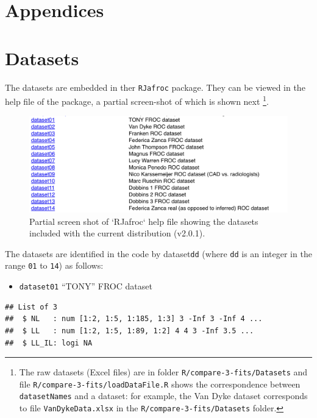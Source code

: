 \documentclass[
]{book}
\providecommand{\tightlist}{%
  \setlength{\itemsep}{0pt}\setlength{\parskip}{0pt}}
\begin{document}
\hypertarget{rsm-3-fits-appendices}{%
\section{Appendices}\label{rsm-3-fits-appendices}}

\hypertarget{rsm-3-fits-14-datasets}{%
\section{Datasets}\label{rsm-3-fits-14-datasets}}

The datasets are embedded in ther \texttt{RJafroc} package. They can be viewed in the help file of the package, a partial screen-shot of which is shown next \footnote{The raw datasets (Excel files) are in folder \texttt{R/compare-3-fits/Datasets} and file \texttt{R/compare-3-fits/loadDataFile.R} shows the correspondence between \texttt{datasetNames} and a dataset: for example, the Van Dyke dataset corresponds to file \texttt{VanDykeData.xlsx} in the \texttt{R/compare-3-fits/Datasets} folder.}.

\begin{figure}

{\centering \includegraphics{images/compare-3-fits/datasets} 

}

\caption{Partial screen shot of `RJafroc` help file showing the datasets included with the current distribution (v2.0.1).}\label{fig:rsm-3-fits-datasets}
\end{figure}

The datasets are identified in the code by dataset\texttt{dd} (where \texttt{dd} is an integer in the range \texttt{01} to \texttt{14}) as follows:

\begin{itemize}
\tightlist
\item
  \texttt{dataset01} ``TONY'' FROC dataset \citep{RN2125}
\end{itemize}

\begin{verbatim}
## List of 3
##  $ NL   : num [1:2, 1:5, 1:185, 1:3] 3 -Inf 3 -Inf 4 ...
##  $ LL   : num [1:2, 1:5, 1:89, 1:2] 4 4 3 -Inf 3.5 ...
##  $ LL_IL: logi NA
\end{verbatim}
\end{document}
